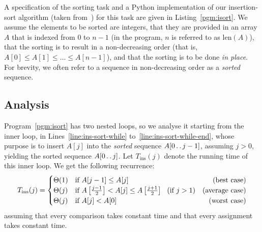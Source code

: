 \documentclass[a4paper,11pt]{article}
\newcommand{\length}[1]{\text{len}(#1)}
\newcommand{\twodots}{\mathinner{\ldotp\ldotp}}  %
\begin{document}
A specification of the sorting task and a Python implementation of our
insertion-sort algorithm (taken from~\cite{CLRS}) for this task are
given in Listing~\ref{pgm:isort}.  We assume the elements to be sorted
are integers, that they are provided in an array $A$ that is indexed
from $0$ to $n-1$ (in the program, $n$ is referred to as
$\length{A}$), that the sorting is to result in a non-decreasing order
(that is, $A[0] \leq A[1] \leq \dots \leq A[n-1]$), and that the
sorting is to be done \emph{in place}.  For brevity, we often refer to
a sequence in non-decreasing order as a \emph{sorted} sequence.

\subsection{Analysis}
\label{sect:analysis:isort}

Program~\ref{pgm:isort} has two nested loops, so we analyse it
starting from the inner loop, in Lines~\ref{line:ins-sort-while}
to~\ref{line:ins-sort-while-end}, whose purpose is to insert $A[j]$
into the \emph{sorted} sequence $A[0 \twodots j-1]$, assuming $j>0$,
yielding the sorted sequence $A[0 \twodots j]$.  Let
$T_{\text{ins}}(j)$ denote the running time of this inner loop.  We
get the following recurrence:
\begin{equation} \label{rec:ins}
  T_{\text{ins}}(j) =
  \begin{cases}
    \Theta(1) & \text{if~} A[j-1] \leq A[j] \hfill \text{(best case)} \\
    \Theta(j) & \text{if~} A\left[\frac{j-1}{2}\right] < A[j] \leq
    A\left[\frac{j+1}{2}\right] \hfill ~~ (\text{if~} j>1) ~~~ \text{(average case)} \\
    \Theta(j) & \text{if~} A[j] < A[0] \hfill \text{(worst case)}
  \end{cases}
\end{equation}
assuming that every comparison takes constant time and that every
assignment takes constant time.
\end{document}

